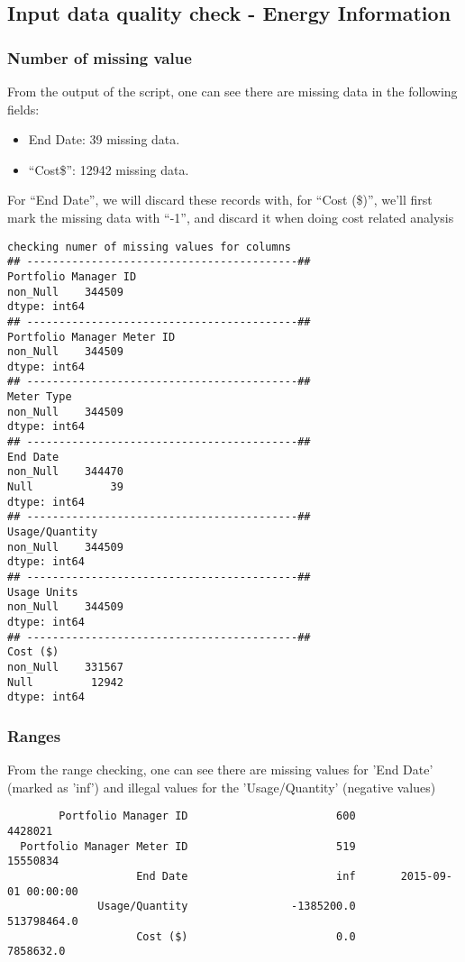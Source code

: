 \documentclass[12pt]{article}
\begin{document}
\subsection{Input data quality check - Energy Information}
\subsubsection{Number of missing value}
From the output of the script, one can see there are missing data in
the following fields:
\begin{itemize}
\item End Date: 39 missing data.
\item ``Cost\$'': 12942 missing data.
\end{itemize}

For ``End Date'', we will discard these records with, for ``Cost
(\$)'', we'll first mark the missing data with ``-1'', and discard it
when doing cost related analysis
\makeatletter
\def\verbatim@font{\linespread{1}\small\ttfamily}
\begin{verbatim}
checking numer of missing values for columns
## ------------------------------------------##
Portfolio Manager ID
non_Null    344509
dtype: int64
## ------------------------------------------##
Portfolio Manager Meter ID
non_Null    344509
dtype: int64
## ------------------------------------------##
Meter Type
non_Null    344509
dtype: int64
## ------------------------------------------##
End Date
non_Null    344470
Null            39
dtype: int64
## ------------------------------------------##
Usage/Quantity
non_Null    344509
dtype: int64
## ------------------------------------------##
Usage Units
non_Null    344509
dtype: int64
## ------------------------------------------##
Cost ($)
non_Null    331567
Null         12942
dtype: int64
\end{verbatim}


\subsubsection{Ranges}
From the range checking, one can see there are missing values for 'End
Date' (marked as 'inf') and illegal values for the 'Usage/Quantity'
(negative values)

\begin{verbatim}
        Portfolio Manager ID                       600                   4428021
  Portfolio Manager Meter ID                       519                  15550834
                    End Date                       inf       2015-09-01 00:00:00
              Usage/Quantity                -1385200.0               513798464.0
                    Cost ($)                       0.0                 7858632.0
\end{verbatim}
\end{document}
